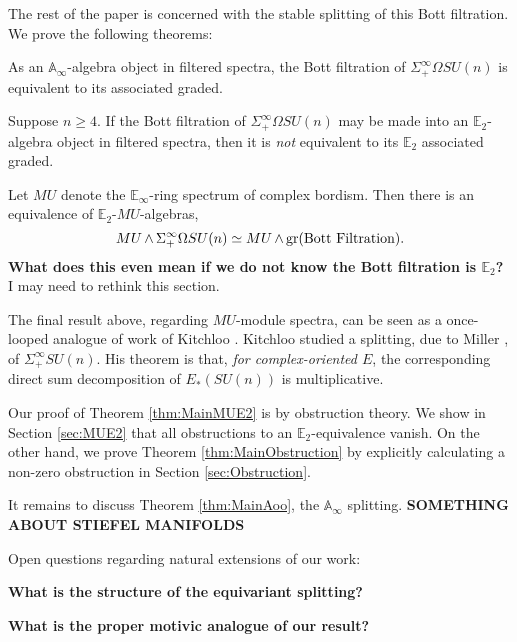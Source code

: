 The rest of the paper is concerned with the stable splitting of this Bott filtration.  We prove the following theorems:

\begin{thm} \label{thm:MainAoo}
As an $\mathbb{A}_\infty$-algebra object in filtered spectra, the Bott filtration of $\Sigma^{\infty}_+ \Omega SU(n)$ is equivalent to its associated graded.
\end{thm}

\begin{thm} \label{thm:MainObstruction}
Suppose $n \ge 4$.  If the Bott filtration of $\Sigma^{\infty}_+ \Omega SU(n)$ may be made into an $\mathbb{E}_2$-algebra object in filtered spectra, then it is \textit{not} equivalent to its $\mathbb{E}_2$ associated graded.
\end{thm}

\begin{thm} \label{thm:MainMUE2}
Let $MU$ denote the $\mathbb{E}_\infty$-ring spectrum of complex bordism.  Then there is an equivalence of $\mathbb{E}_2$-$MU$-algebras, 
$$MU \operatorname{\wedge} \Sigma^{\infty}_+ \Omega SU(n) \simeq MU \operatorname{\wedge} \text{gr}(\text{Bott Filtration}).$$
\textbf{What does this even mean if we do not know the Bott filtration is $\mathbb{E}_2$?}  I may need to rethink this section.
\end{thm}

The final result above, regarding $MU$-module spectra, can be seen as a once-looped analogue of work of Kitchloo \cite{Kitchloo}.   Kitchloo studied a splitting, due to Miller \cite{MillerSplitting}, of $\Sigma^{\infty}_+ SU(n)$.  His theorem is that, \textit{for complex-oriented $E$}, the corresponding direct sum decomposition of $E_*(SU(n))$ is multiplicative.

Our proof of Theorem \ref{thm:MainMUE2} is by obstruction theory.  We show in Section \ref{sec:MUE2} that all obstructions to an $\mathbb{E}_2$-equivalence vanish.  On the other hand, we prove Theorem \ref{thm:MainObstruction} by explicitly calculating a non-zero obstruction in Section \ref{sec:Obstruction}.

It remains to discuss Theorem \ref{thm:MainAoo}, the $\mathbb{A}_\infty$ splitting.
\textbf{SOMETHING ABOUT STIEFEL MANIFOLDS}

Open questions regarding natural extensions of our work:

\textbf{What is the structure of the equivariant splitting?}

\textbf{What is the proper motivic analogue of our result?}





